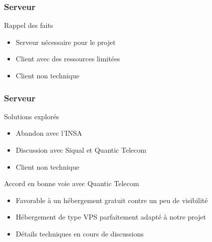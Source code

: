 \speaker{\Matthieu}

\begin{frame}
	\frametitle{Serveur}
	\begin{block}{Rappel des faits}
      \begin{itemize}
        \item Serveur nécessaire pour le projet
        \item Client avec des ressources limitées
        \item Client non technique
      \end{itemize}
     \end{block}
\end{frame}

\begin{frame}
	\frametitle{Serveur}
	\begin{block}{Solutions explorés}
      \begin{itemize}
        \item Abandon avec l'INSA
        \item Discussion avec Siqual et Quantic Telecom
        \item Client non technique
      \end{itemize}
     \end{block}
     
    \begin{block}{Accord en bonne voie avec Quantic Telecom}
	  \begin{itemize}
		\item Favorable à un hébergement gratuit contre un peu de visibilité
		\item Hébergement de type VPS parfaitement adapté à notre projet
		\item Détails techniques en cours de discussions
	  \end{itemize}
	\end{block}
\end{frame}

